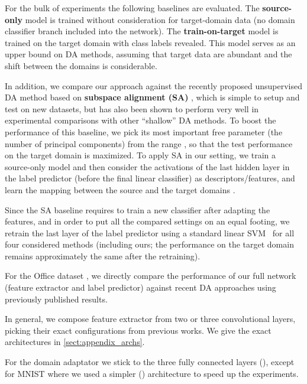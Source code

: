 \documentclass{article}
\begin{document}
\vspace{2mm} For the bulk of experiments the following baselines are evaluated. The \textbf{source-only} model is trained without consideration for target-domain data (no domain classifier branch included into the network). The \textbf{train-on-target} model is trained on the target domain with class labels revealed. This model serves as an upper bound on DA methods, assuming that target data are abundant and the shift between the domains is considerable. 

In addition, we compare our approach against the recently proposed unsupervised DA method based on \textbf{subspace alignment (SA)} \cite{Fernando13}, which is simple to setup and test on new datasets, but has also been shown to perform very well in experimental comparisons with other ``shallow'' DA methods. To boost the performance of this baseline, we pick its most important free parameter (the number of principal components) from the range , so that the test performance on the target domain is maximized. To apply SA in our setting, we train a source-only model and then consider the activations of the last hidden layer in the label predictor (before the final linear classifier) as descriptors/features, and learn the mapping between the source and the target domains \cite{Fernando13}.

Since the SA baseline requires to train a new classifier after adapting the features, and in order to put all the compared settings on an equal footing, we retrain the last layer of the label predictor using a standard linear SVM~\cite{liblinear} for all four considered methods (including ours; the performance on the target domain remains approximately the same after the retraining). 

For the {\sc Office} dataset \cite{Saenko10}, we directly compare the performance of our full network (feature extractor and label predictor) against recent DA approaches using previously published results.

\vspace{2mm} In general, we compose feature extractor from two or three convolutional layers, picking their exact configurations from previous works. We give the exact architectures in \ref{sect:appendix_archs}.

For the domain adaptator we stick to the three fully connected layers (), except for {\sc MNIST} where we used a simpler () architecture to speed up the experiments.
\end{document}
